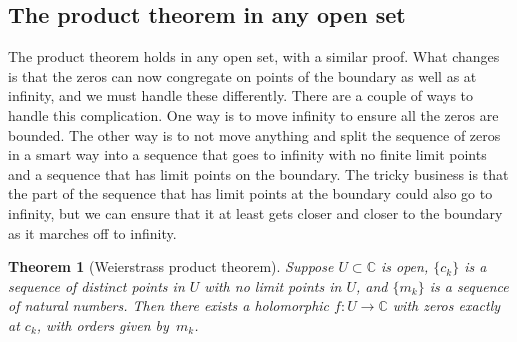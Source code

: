 \documentclass[12pt,openany]{book}
\newcommand{\C}{{\mathbb{C}}}
\theoremstyle{plain}
\newtheorem{thm}{Theorem}[section]
\theoremstyle{remark}
\theoremstyle{definition}
\theoremstyle{exercise}
\theoremstyle{example}
\begin{document}
\subsection{The product theorem in any open set}

The product theorem holds in any open set, with a similar proof.
What changes is that the zeros can now congregate on points of
the boundary as well as at infinity,
and we must handle these differently.
There are a couple of ways to handle
this complication.
One way is to move infinity to ensure all the zeros are bounded.
The other way is to not move anything and split the sequence of zeros in a
smart way into a sequence that goes to infinity with no finite limit
points and a sequence that has limit points on the boundary.  The tricky
business is that the part of the sequence that has limit points at the
boundary could also go to infinity, but we can ensure that it at least gets
closer and closer to the boundary as it marches off to infinity.

\begin{thm}[Weierstrass product theorem]
\label{thm:weierprod}
Suppose $U \subset \C$ is open, $\{ c_k \}$ is
a sequence of distinct points in $U$
with no limit points in $U$, and $\{ m_k \}$ is a sequence of
natural numbers.
Then there exists a holomorphic $f \colon U \to \C$ with
zeros exactly at $c_k$, with orders given by~$m_k$.
\end{thm}
\end{document}
